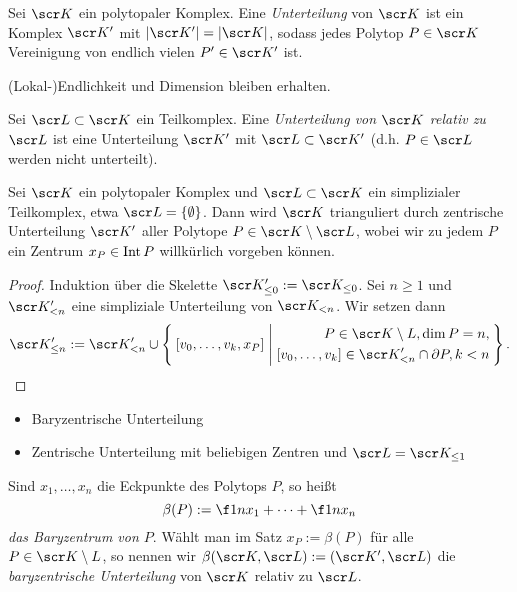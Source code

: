 \begin{df}
	Sei $\scr K$ ein polytopaler Komplex.
	Eine \emph{Unterteilung} von $\scr K$ ist ein Komplex $\scr K'$ mit $|\scr K'| = |\scr K|$, sodass jedes Polytop $P \in \scr K$ Vereinigung von endlich vielen $P' \in \scr K'$ ist.
	\begin{note}
		(Lokal-)Endlichkeit und Dimension bleiben erhalten.
	\end{note}
\end{df}

\begin{df}
	Sei $\scr L \subset \scr K$ ein Teilkomplex.
	Eine \emph{Unterteilung von $\scr K$ relativ zu $\scr L$} ist eine Unterteilung $\scr K'$ mit $\scr L \subset \scr K'$ (d.h. $P \in \scr L$ werden nicht unterteilt).
\end{df}

\begin{st}
	Sei $\scr K$ ein polytopaler Komplex und $\scr L \subset \scr K$ ein simplizialer Teilkomplex, etwa $\scr L = \{\emptyset\}$.
	Dann wird $\scr K$ trianguliert durch zentrische Unterteilung $\scr K'$ aller Polytope $P \in \scr K \setminus \scr L$, wobei wir zu jedem $P$ ein Zentrum $x_P \in \operatorname{Int} P$ willkürlich vorgeben können.
	\begin{proof}
		Induktion über die Skelette $\scr K_{\le 0}' := \scr K_{\le 0}$.
		Sei $n \ge 1$ und $\scr K'_{<n}$ eine simpliziale Unterteilung von $\scr K_{<n}$.
		Wir setzen dann
		\[
			\scr K_{\le n}'
			:= \scr K_{<n}' \cup
			\Set{ [v_0,\dotsc, v_k, x_P] |
				\begin{aligned}
					P \in \scr K \setminus L, \dim P = n, \\
					[v_0, \dotsc, v_k] \in \scr K'_{<n} \cap \boundary P, k < n
				\end{aligned}}.
		\]
	\end{proof}
\end{st}

\begin{ex}
	\begin{itemize}
		\item
			Baryzentrische Unterteilung
		\item
			Zentrische Unterteilung mit beliebigen Zentren und $\scr L = \scr K_{\le 1}$
	\end{itemize}
\end{ex}

\begin{df}
	Sind $x_1, \dotsc, x_n$ die Eckpunkte des Polytops $P$, so heißt
	\[
		\beta(P) := \f 1n x_1 + \dotsb + \f 1n x_n
	\]
	\emph{das Baryzentrum von $P$}.
	Wählt man im Satz %
	$x_P := \beta(P)$ für alle $P \in \scr K \setminus L$, so nennen wir $\beta(\scr K, \scr L) := (\scr K', \scr L)$ die \emph{baryzentrische Unterteilung} von $\scr K$ relativ zu $\scr L$.
\end{df}

